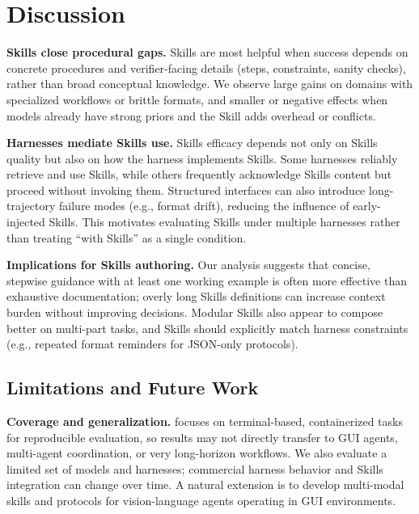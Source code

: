 \vspace{-4pt}
\section{Discussion}
\vspace{-4pt}
\label{sec:discussion}

\textbf{Skills close procedural gaps.}
Skills are most helpful when success depends on concrete procedures and verifier-facing details (steps, constraints, sanity checks), rather than broad conceptual knowledge. We observe large gains on domains with specialized workflows or brittle formats, and smaller or negative effects when models already have strong priors and the Skill adds overhead or conflicts.

\textbf{Harnesses mediate Skills use.}
Skills efficacy depends not only on Skills quality but also on how the harness implements Skills. Some harnesses reliably retrieve and use Skills, while others frequently acknowledge Skills content but proceed without invoking them. Structured interfaces can also introduce long-trajectory failure modes (e.g., format drift), reducing the influence of early-injected Skills. This motivates evaluating Skills under multiple harnesses rather than treating “with Skills” as a single condition.

\textbf{Implications for Skills authoring.}
Our analysis suggests that concise, stepwise guidance with at least one working example is often more effective than exhaustive documentation; overly long Skills definitions can increase context burden without improving decisions. Modular Skills also appear to compose better on multi-part tasks, and Skills should explicitly match harness constraints (e.g., repeated format reminders for JSON-only protocols).


\subsection{Limitations and Future Work}

\textbf{Coverage and generalization.}
\benchmarkName{} focuses on terminal-based, containerized tasks for reproducible evaluation, so results may not directly transfer to GUI agents, multi-agent coordination, or very long-horizon workflows. We also evaluate a limited set of models and harnesses; commercial harness behavior and Skills integration can change over time. A natural extension is to develop multi-modal skills and protocols for vision-language agents operating in GUI environments.

